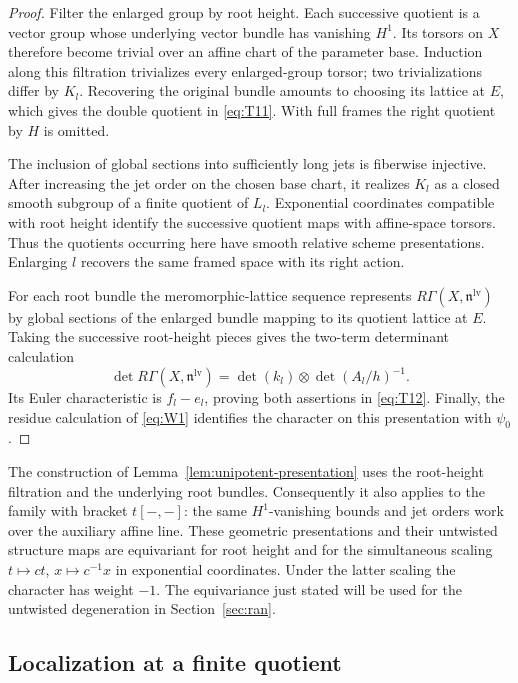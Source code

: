 \begin{proof}
Filter the enlarged group by root height.  Each successive quotient
is a vector group whose underlying vector bundle has vanishing
$H^1$.  Its torsors on $X$ therefore become trivial over an affine
chart of the parameter base.  Induction along this filtration
trivializes every enlarged-group torsor; two trivializations differ
by $K_l$.  Recovering the original bundle amounts to choosing its
lattice at $E$, which gives the double quotient in \eqref{eq:T11}.
With full frames the right quotient by $H$ is omitted.

The inclusion of global sections into sufficiently long jets is
fiberwise injective.  After increasing the jet order on the chosen
base chart, it realizes $K_l$ as a closed smooth subgroup of a finite
quotient of $L_l$.  Exponential coordinates compatible with root
height identify the successive quotient maps with affine-space
torsors.  Thus the quotients occurring here have smooth relative
scheme presentations.  Enlarging $l$ recovers the same framed space
with its right action.

For each root bundle the meromorphic-lattice sequence represents
$R\Gamma(X,\mathfrak n^{\mathrm{lv}})$ by global sections of the
enlarged bundle mapping to its quotient lattice at $E$.  Taking the
successive root-height pieces gives the two-term determinant
calculation
\[
 \det R\Gamma(X,\mathfrak n^{\mathrm{lv}})
       =\det(k_l)\otimes\det(A_l/h)^{-1}.
\]
Its Euler characteristic is $f_l-e_l$, proving both assertions in
\eqref{eq:T12}.  Finally, the residue calculation of \eqref{eq:W1}
identifies the character on this presentation with $\psi_0$.
\end{proof}

The construction of Lemma~\ref{lem:unipotent-presentation} uses the
root-height filtration and the underlying root bundles.  Consequently
it also applies to the family with bracket $t[-,-]$: the same
$H^1$-vanishing bounds and jet orders work over the auxiliary affine
line.  These geometric presentations and their untwisted structure
maps are equivariant for root height and for the simultaneous scaling
$t\mapsto ct$, $x\mapsto c^{-1}x$ in exponential coordinates.
Under the latter scaling the character has weight $-1$.  The
equivariance just stated will be used for the untwisted degeneration
in Section~\ref{sec:ran}.

\subsection{Localization at a finite quotient}

